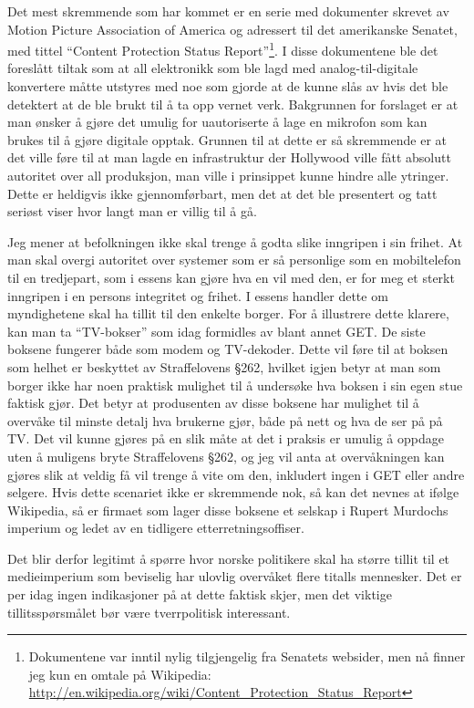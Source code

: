 \documentclass[11pt,norsk,a4paper]{article}
\begin{document}
Det mest skremmende som har kommet er en serie med dokumenter skrevet
av Motion Picture Association of America og adressert til det
amerikanske Senatet, med tittel ``Content Protection Status
Report''\footnote{Dokumentene var inntil nylig tilgjengelig fra
  Senatets websider, men nå finner jeg kun en omtale på Wikipedia:
  \url{http://en.wikipedia.org/wiki/Content_Protection_Status_Report}}.
I disse dokumentene ble det foreslått tiltak som at all elektronikk
som ble lagd med analog-til-digitale konvertere måtte utstyres med noe
som gjorde at de kunne slås av hvis det ble detektert at de ble brukt
til å ta opp vernet verk. Bakgrunnen for forslaget er at man ønsker å
gjøre det umulig for uautoriserte å lage en mikrofon som kan brukes
til å gjøre digitale opptak. Grunnen til at dette er så skremmende er at
det ville føre til at man lagde en infrastruktur der Hollywood ville
fått absolutt autoritet over all produksjon, man ville i prinsippet
kunne hindre alle ytringer. Dette er heldigvis ikke
gjennomførbart, men det at det ble presentert og tatt seriøst viser
hvor langt man er villig til å gå. 

Jeg mener at befolkningen ikke skal trenge å godta slike inngripen i
sin frihet. At man skal overgi autoritet over systemer som er så
personlige som en mobiltelefon til en tredjepart, som i essens kan
gjøre hva en vil med den, er for meg et sterkt inngripen i en persons
integritet og frihet. I essens handler dette om myndighetene skal ha
tillit til den enkelte borger. For å illustrere dette klarere, kan man
ta ``TV-bokser'' som idag formidles av blant annet GET. De siste
boksene fungerer både som modem og TV-dekoder. Dette vil føre til at
boksen som helhet er beskyttet av Straffelovens §262, hvilket igjen
betyr at man som borger ikke har noen praktisk mulighet til å
undersøke hva boksen i sin egen stue faktisk gjør. Det betyr at
produsenten av disse boksene har mulighet til å overvåke til minste
detalj hva brukerne gjør, både på nett og hva de ser på på TV. Det vil
kunne gjøres på en slik måte at det i praksis er umulig å oppdage uten
å muligens bryte Straffelovens §262, og jeg vil anta at overvåkningen
kan gjøres slik at veldig få vil trenge å vite om den, inkludert ingen
i GET eller andre selgere. Hvis dette scenariet ikke er skremmende
nok, så kan det nevnes at ifølge Wikipedia\cite{ndswiki}, så er firmaet som lager
disse boksene et selskap i Rupert Murdochs imperium og ledet av en
tidligere etterretningsoffiser.

Det blir derfor legitimt å spørre hvor norske politikere skal ha
større tillit til et medieimperium som beviselig har ulovlig overvåket
flere titalls mennesker\cite{newscorpphone}. Det er per idag ingen
indikasjoner på at dette faktisk skjer, men det viktige
tillitsspørsmålet bør være tverrpolitisk interessant. 
\end{document}
